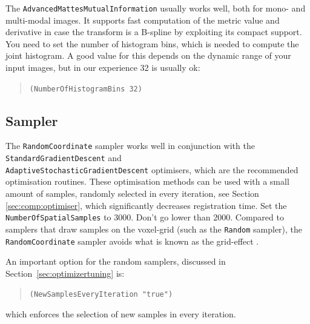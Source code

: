 \documentclass[]{report}
\begin{document}
The \texttt{AdvancedMattesMutualInformation} usually works well,
both for mono- and multi-modal images. It supports fast computation
of the metric value and derivative in case the transform is a
B-spline by exploiting its compact support. You need to set the
number of histogram bins, which is needed to compute the joint
histogram. A good value for this depends on the dynamic range of
your input images, but in our experience 32 is usually ok:
\begin{quote}
\texttt{(NumberOfHistogramBins 32)}
\end{quote}

\subsection{Sampler}\label{sec:samplertuning}

The \texttt{RandomCoordinate} sampler works well in conjunction with
the \texttt{StandardGradientDescent} and\\
\texttt{AdaptiveStochasticGradientDescent} optimisers, which are the
recommended optimisation routines. These optimisation methods can be
used with a small amount of samples, randomly selected in every
iteration, see Section \ref{sec:comp:optimiser}, which significantly
decreases registration time. Set the \texttt{NumberOfSpatialSamples}
to 3000. Don't go lower than 2000. Compared to samplers that draw
samples on the voxel-grid (such as the \texttt{Random} sampler), the
\texttt{RandomCoordinate} sampler avoids what is known as the
grid-effect \citep{The08:Halton}.

An important option for the random samplers, discussed in
Section~\ref{sec:optimizertuning} is:
\begin{quote}
  \texttt{(NewSamplesEveryIteration "true")}
\end{quote}
which enforces the selection of new samples in every iteration.
\end{document}
